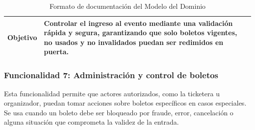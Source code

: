 \documentclass[12pt,letterpaper]{article}
\begin{document}
\begin{table}[H]
\begin{tabularx}{\textwidth}{|p{3.2cm}|X|p{4.2cm}|}
\textbf{Objetivo} & 
\multicolumn{2}{X|}{Controlar el ingreso al evento mediante una validación rápida y segura, garantizando que solo boletos vigentes, no usados y no invalidados puedan ser redimidos en puerta.} \\ \hline

\end{tabularx}

\caption{Formato de documentación del Modelo del Dominio}
\label{tab:modelo_dominio_qr_validacion_boleto}
\normalsize
\end{table}
\subsubsection{Funcionalidad 7: Administración y control de boletos}
Esta funcionalidad permite que actores autorizados, como la ticketera u organizador, puedan tomar acciones sobre boletos específicos en casos especiales. Se usa cuando un boleto debe ser bloqueado por fraude, error, cancelación o alguna situación que comprometa la validez de la entrada.
\end{document}
